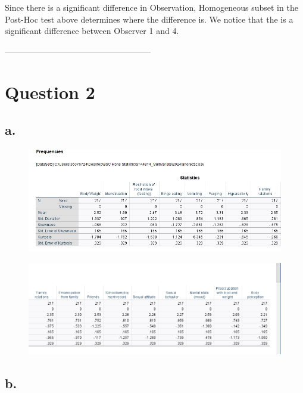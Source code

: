 \documentclass[english,10pt,a4paper]{article}
\begin{document}
	Since there is a significant difference in Observation, Homogeneous subset in the Post-Hoc test above determines where the difference
	is. We notice that the is a significant difference between Observer 1 and 4.
	
	
-----------------------------------------------------	
	
	
	\section{Question 2}
	
\subsection*{a.}	
	
	\begin{figure}[h]
		
		\includegraphics[width=1\linewidth]{Frequecy1.png}
	\end{figure}
	
	
	\begin{figure}[h]
		
		\includegraphics[width=1\linewidth]{Frequency2.png}
	\end{figure}
	
	


\subsection*{b.}
\end{document}
